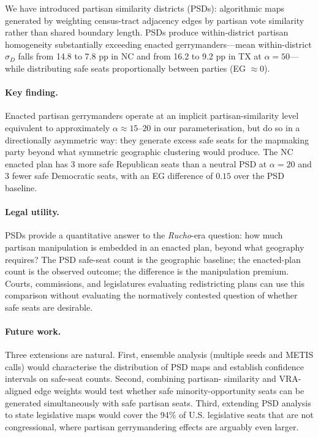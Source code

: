 We have introduced partisan similarity districts (PSDs): algorithmic maps
generated by weighting census-tract adjacency edges by partisan vote
similarity rather than shared boundary length.  PSDs produce within-district
partisan homogeneity substantially exceeding enacted gerrymanders---mean
within-district $\sigma_D$ falls from 14.8 to 7.8 pp in NC and from 16.2
to 9.2 pp in TX at $\alpha = 50$---while distributing safe seats
proportionally between parties (EG $\approx 0$).\singrun

\paragraph{Key finding.}
Enacted partisan gerrymanders operate at an implicit partisan-similarity
level equivalent to approximately $\alpha \approx 15$--$20$ in our
parameterisation, but do so in a directionally asymmetric way: they generate
excess safe seats for the mapmaking party beyond what symmetric geographic
clustering would produce.  The NC enacted plan has 3 more safe Republican
seats than a neutral PSD at $\alpha = 20$ and 3 fewer safe Democratic seats,
with an EG difference of $0.15$ over the PSD baseline.\singrun

\paragraph{Legal utility.}
PSDs provide a quantitative answer to the \emph{Rucho}-era question: how
much partisan manipulation is embedded in an enacted plan, beyond what
geography requires?  The PSD safe-seat count is the geographic baseline;
the enacted-plan count is the observed outcome; the difference is the
manipulation premium.  Courts, commissions, and legislatures evaluating
redistricting plans can use this comparison without evaluating the
normatively contested question of whether safe seats are desirable.

\paragraph{Future work.}
Three extensions are natural.  First, ensemble analysis (multiple seeds and
METIS calls) would characterise the distribution of PSD maps and establish
confidence intervals on safe-seat counts.  Second, combining partisan-
similarity and VRA-aligned edge weights would test whether safe
minority-opportunity seats can be generated simultaneously with safe partisan
seats.  Third, extending PSD analysis to state legislative maps would cover
the 94\% of U.S. legislative seats that are not congressional, where partisan
gerrymandering effects are arguably even larger.
